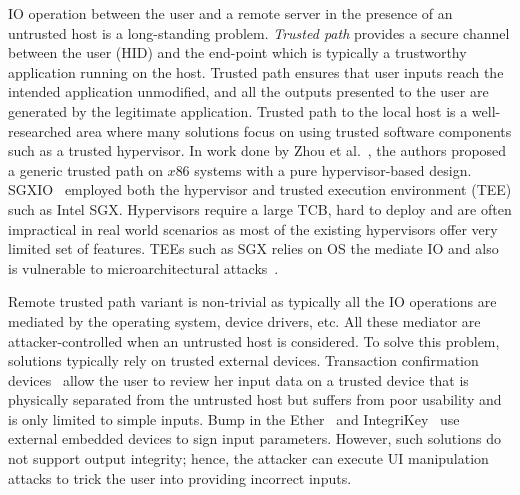 IO operation between the user and a remote server in the presence of an untrusted host is a long-standing problem. \emph{Trusted path} provides a secure channel between the user (HID) and the end-point which is typically a trustworthy application running on the host. Trusted path ensures that user inputs reach the intended application unmodified, and all the outputs presented to the user are generated by the legitimate application. Trusted path to the local host is a well-researched area where many solutions focus on using trusted software components such as a trusted hypervisor. In work done by Zhou et al.~\cite{zhou2012building}, the authors proposed a generic trusted path on $x86$ systems with a pure hypervisor-based design. SGXIO~\cite{weiser2017sgxio} employed both the hypervisor and trusted execution environment (TEE) such as Intel SGX. Hypervisors require a large TCB, hard to deploy and are often impractical in real world scenarios as most of the existing  hypervisors offer very limited set of features. TEEs such as SGX relies on OS the mediate IO and also is vulnerable to microarchitectural attacks~\cite{van2018foreshadow}.

Remote trusted path variant is non-trivial as typically all the IO operations are mediated by the operating system, device drivers, etc. All these mediator are attacker-controlled when an  untrusted host is considered. To solve this problem, solutions typically rely on trusted external devices. Transaction confirmation devices~\cite{filyanov2011uni,weigold2011secure} allow the user to review her input data on a trusted device that is physically separated from the untrusted host but suffers from poor usability and is only limited to simple inputs. Bump in the Ether~\cite{McCPerRei2006} and IntegriKey~\cite{IntegriKey} use external embedded devices to sign input parameters. However, such solutions do not support output integrity; hence, the attacker can execute UI manipulation attacks to trick the user into providing incorrect inputs.

